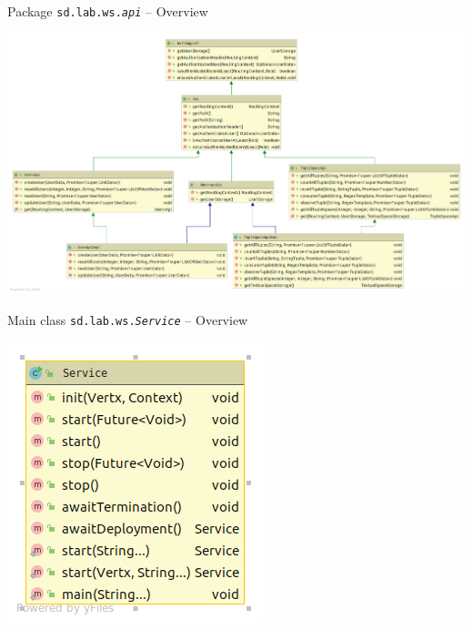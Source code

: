 \documentclass[presentation]{beamer}\mode<presentation>{\usetheme{AMSCesenaPurpleAndGold}}
\begin{document}
\begin{frame}{Package \texttt{sd.lab.ws.\textit{api}} -- Overview}
    
    \centering
    \includegraphics[width=\linewidth]{img/pkg-api.png}
    
\end{frame}

\begin{frame}{Main class \texttt{sd.lab.ws.\textit{Service}} -- Overview}
    
    \centering
    \includegraphics[width=.5\linewidth]{img/Service.png}
    
\end{frame}
\end{document}
